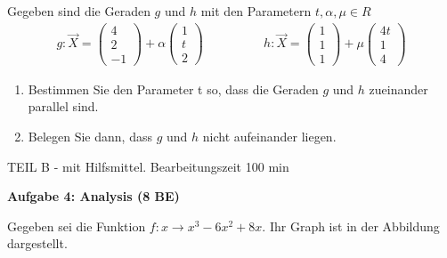\documentclass[a4paper,12pt]{article}
\newcommand{\Aufgabe}[1]{
  {
  \vspace*{0.5cm}
  \textsf{\textbf{Aufgabe #1}}
  \vspace*{0.2cm}
  
  }
}
\begin{document}
 Gegeben sind die Geraden $g$ und $h$ mit den  Parametern $t, \alpha, \mu  \in R$
\[
\begin {aligned}
   g: \vec{X}= \begin{pmatrix} 4 \\
                              2 \\
                                -1
                  \end{pmatrix}
           + \alpha \begin{pmatrix} 1 \\
                                t\\
                                2
                  \end{pmatrix}
\end {aligned}
\qquad
\qquad
\begin {aligned}
    h: \vec{X}= \begin{pmatrix} 1\\
                              1 \\
                                1
                  \end{pmatrix}
           + \mu \begin{pmatrix} 4t \\
                                1 \\
                                4
                  \end{pmatrix}
\end {aligned}
\]
\begin{enumerate}[label={\alph*)}] 
\item Bestimmen Sie den Parameter t so, dass die Geraden $g$ und $h$ zueinander parallel sind.
\item Belegen Sie dann, dass $g$ und $h$ nicht aufeinander liegen.
\end{enumerate}



\newpage
\vspace*{-4\baselineskip}
\enlargethispage{3cm}
{TEIL B} - mit Hilfsmittel. Bearbeitungszeit 100 min


\Aufgabe{4: Analysis (8 BE)}
Gegeben sei die Funktion $f: x\rightarrow x^3-6x^2+8x $.
Ihr Graph ist in der Abbildung dargestellt.\\
\end{document}
